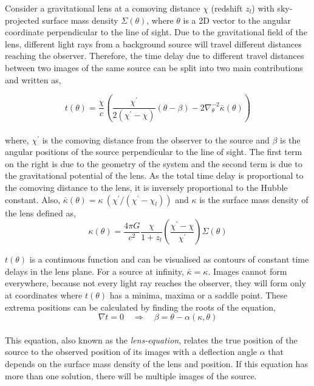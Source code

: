 Consider a gravitational lens at a comoving distance $\chi$ (redshift $z_l$) 
with sky-projected surface
mass density $\Sigma(\theta)$, where $\theta$ is a 2D vector to the
angular coordinate perpendicular to the line of sight. Due to the 
gravitational field of the lens, different light rays from a background source
will travel different distances reaching the observer. Therefore, the time delay
due to different travel distances between two images of the same source can be
split into two main contributions and written as,

\begin{equation}
	t(\theta) = \dfrac{\chi}{c} \left( \dfrac{\chi^{\prime}}{2(\chi^{\prime}-\chi)} 
				(\theta-\beta) 
				- 2\nabla_{\theta}^{-2} \bar{\kappa}(\theta) \right)
	\label{eqn:timedelay}
\end{equation}
\\
where, $\chi^{\prime}$ is the comoving distance from the observer
to the source and $\beta$ is 
the angular positions of the source perpendicular to the line of sight.
The first term on the right is due to the geometry of the system
and the second term is due to the gravitational potential of the lens.
As the total time delay is proportional to the comoving distance
to the lens, it is inversely proportional to the Hubble constant. 
Also, $\bar{\kappa}(\theta) = \kappa\ (\chi^{\prime}/(\chi^{\prime}-\chi_l))$ and
$\kappa$ is the surface mass density of the lens defined as,
\begin{equation}
	\kappa(\theta) = \dfrac{4\pi G}{c^2} \dfrac{\chi}{1+z_l}
					  \left(\dfrac{\chi^{\prime}-\chi}{\chi^{\prime}}\right) \Sigma(\theta)
\end{equation}

$t(\theta)$ is a continuous function and can be visualised as contours
of constant time delays in the lens plane. For a source at infinity,
$\bar{\kappa}=\kappa$.
Images cannot form everywhere, because not every light
ray reaches the observer, they will form only at coordinates where $t(\theta)$
has a minima, maxima or a saddle point. These extrema positions can 
be calculated by finding the roots of the equation,
\begin{equation}
	\nabla t = 0 \quad \Rightarrow \quad \beta = \theta - \alpha(\kappa,\theta)
\end{equation}
\\
This equation, also known as the {\it lens-equation}, relates the true 
position of the source to the observed position of its images with
a deflection angle $\alpha$ that depends on the surface mass density
of the lens and position. If this equation has more than one solution,
there will be multiple images of the source.


